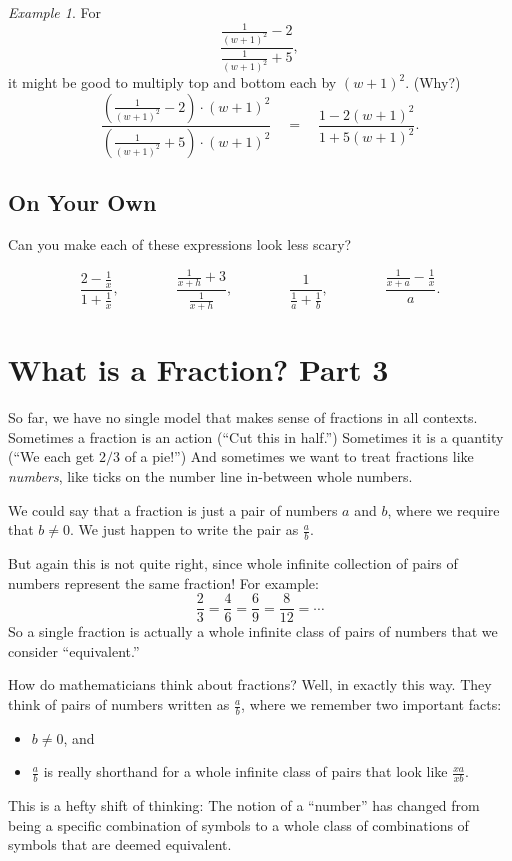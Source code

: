 \documentclass[10pt, reqno]{amsart}
\theoremstyle{remark}
\newtheorem{example}[thm]{Example}
\theoremstyle{definition}
\numberwithin{equation}{section}  %
\begin{document}
\begin{example}
For 
\[
\frac{\frac 1 {(w+1)^2} - 2}{\frac 1 {(w+1)^2} +5},
\]
it might be good to multiply top and bottom each by $(w+1)^2$.  (Why?)
\[
\frac{\left(\frac 1 {(w+1)^2} - 2\right)\cdot (w+1)^2}{\left(\frac 1 {(w+1)^2} +5\right)\cdot (w+1)^2}
\quad
=
\quad
\frac{1 - 2(w+1)^2}{1+5(w+1)^2}.
\]


\end{example}

\subsection*{On Your Own}
Can you make each of these expressions look less scary?

\[
\frac{2-\frac 1 x}{1 + \frac 1 x},
\qquad\qquad
\frac{\frac1{x+h} + 3}{\frac 1{x+h}},
\qquad\qquad
\frac{1}{\frac 1 a + \frac 1 b},
\qquad\qquad
\frac{\frac{1}{x+a} - \frac 1 x} a.
\]






\section{What is a Fraction? Part 3}
So far, we have no single model that makes sense of fractions in all contexts.  Sometimes a fraction is an action (``Cut this in half.'')  Sometimes it is a quantity (``We each get $2/3$ of a pie!'')  And sometimes we want to treat fractions like \emph{numbers}, like ticks on the number line in-between whole numbers.

We could say that a fraction is just a pair of numbers $a$ and $b$, where we require that $b \neq 0$.  We just happen to write the pair as $\frac a b$.  

But again this is not quite right, since whole infinite collection of pairs of numbers represent
the same fraction!  For example:
\[
\frac 2 3 = \frac 4 6 = \frac 6 9 = \frac 8 {12} = \cdots
\]
 So a single fraction is actually a
whole infinite class of pairs of numbers that we consider ``equivalent.''
 


How do mathematicians think about fractions?  Well, in exactly this way.  They think of pairs of numbers written as $\frac a b$, where we remember two important facts:
\begin{itemize}
\item
$b \neq 0$, and
\item
$\frac a b$ is really shorthand for a whole infinite class of pairs that look like $\frac{xa}{xb}$.

\end{itemize}
This is a hefty shift of thinking: The notion of a ``number'' has changed from being a
specific combination of symbols to a whole class of combinations of
symbols that are deemed equivalent.
\end{document}
